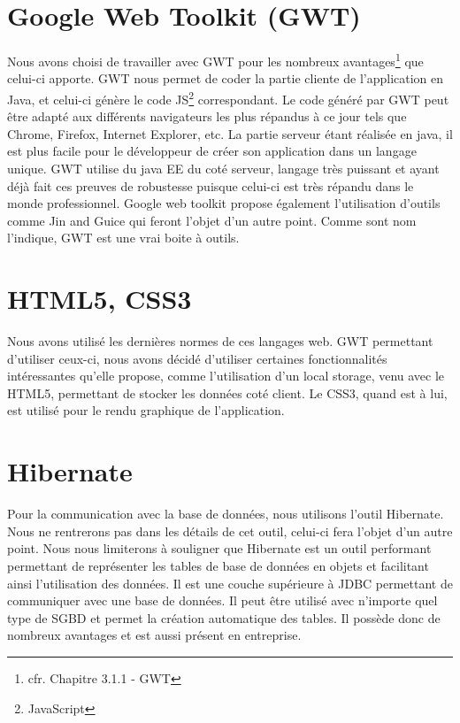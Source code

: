 \section{Google Web Toolkit (GWT)}

Nous avons choisi de travailler avec GWT pour les nombreux avantages\footnote{cfr. Chapitre 3.1.1 - GWT} que celui-ci apporte. GWT nous permet de coder la partie cliente de l'application en Java, et celui-ci génère le code JS\footnote{JavaScript} correspondant. Le code généré par GWT peut être adapté aux différents navigateurs les plus répandus à ce jour tels que Chrome, Firefox, Internet Explorer, etc.
\newline
\indent
La partie serveur étant réalisée en java, il est plus facile pour le développeur de créer son application dans un langage unique. GWT utilise du java EE du coté serveur, langage très puissant et ayant déjà fait ces preuves de robustesse puisque celui-ci est très répandu dans le monde professionnel. Google web toolkit propose également l'utilisation d'outils comme Jin and Guice qui feront l'objet d'un autre point. Comme sont nom l'indique, GWT est une vrai boite à outils.


\section{HTML5, CSS3}
Nous avons utilisé les dernières normes de ces langages web. GWT permettant d'utiliser ceux-ci, nous avons décidé d'utiliser certaines fonctionnalités intéressantes qu'elle propose, comme l'utilisation d'un local storage, venu avec le HTML5, permettant de stocker les données coté client. Le CSS3, quand est à lui, est utilisé pour le rendu graphique de l'application.

\section{Hibernate}
Pour la communication avec la base de données, nous utilisons l'outil Hibernate. Nous ne rentrerons pas dans les détails de cet outil, celui-ci fera l'objet d'un autre point. Nous nous limiterons à souligner que Hibernate est un outil performant permettant de représenter les tables de base de données en objets et facilitant ainsi l'utilisation des données. Il est une couche supérieure à JDBC permettant de communiquer avec une base de données. Il peut être utilisé avec n'importe quel type de SGBD et permet la création automatique des tables. Il possède donc de nombreux avantages et est aussi présent en entreprise.

